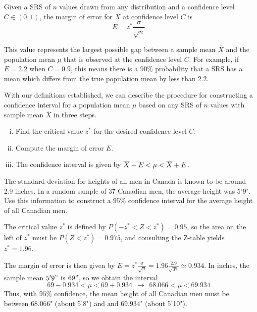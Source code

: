 \begin{defn} Given a SRS of $n$ values drawn from any distribution and a confidence level $C \in (0,1)$, the margin of error for $\overline{X}$ at confidence level $C$ is 
$$\boxed{E = z^* \frac{\sigma}{\sqrt{n}}}$$
\end{defn}
\par
This value represents the largest possible gap between a sample mean $\overline{X}$ and the population mean $\mu$ that is observed at the confidence level $C$. For example, if $E = 2.2$ when $C = 0.9$, this means there is a $90\%$ probability that a SRS has a mean which differs from the true population mean by less than $2.2$.
\par
With our definitions established, we can describe the procedure for constructing a confidence interval for a population mean $\mu$ based on any SRS of $n$ values with sample mean $\overline{X}$ in three steps.
\begin{enumerate}[(i)]
\item Find the critical value $z^*$ for the desired confidence level $C$.
\item Compute the margin of error $E$.
\vspace*{-0.02in}
\item The confidence interval is given by ${\overline{X}} - E < \mu < {\overline{X}} + E$.
\end{enumerate}
\begin{example} 
The standard deviation for heights of all men in Canada is known to be around 2.9 inches. In a random sample of 37 Canadian men, the average height was 5'9". Use this information to construct a $95\%$ confidence interval for the average height of all Canadian men.
\par
\noindent The critical value $z^*$ is defined by $P(-z^* < Z < z^*) = 0.95$, so the area on the left of $z^*$ must be $P(Z < z^*) = 0.975$, and consulting the Z-table yields $z^* = 1.96$.
\begin{center}
\end{center}
\noindent The margin of error is then given by $E = z^*  \frac{\sigma}{\sqrt{n}} = 1.96  \frac{2.9}{\sqrt{37}} \simeq 0.934$. In inches, the sample mean $5'9"$ is $69"$, so we obtain the interval 
$$69-0.934 < \mu < 69+0.934 \ \ \rightarrow \ \ 68.066 < \mu < 69.934$$
\noindent Thus, with $95\%$ confidence, the mean height of all Canadian men must be between 68.066" (about 5'8") and and 69.934" (about 5'10").
\end{example}
